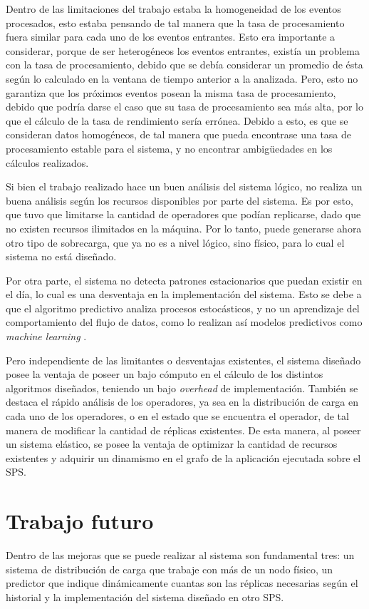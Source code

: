 Dentro de las limitaciones del trabajo estaba la homogeneidad de los eventos procesados, esto estaba pensando de tal manera que la tasa de procesamiento fuera similar para cada uno de los eventos entrantes. Esto era importante a considerar, porque de ser heterogéneos los eventos entrantes, existía un problema con la tasa de procesamiento, debido que se debía considerar un promedio de ésta según lo calculado en la ventana de tiempo anterior a la analizada. Pero, esto no garantiza que los próximos eventos posean la misma tasa de procesamiento, debido que podría darse el caso que su tasa de procesamiento sea más alta, por lo que el cálculo de la tasa de rendimiento sería errónea. Debido a esto, es que se consideran datos homogéneos, de tal manera que pueda encontrase una tasa de procesamiento estable para el sistema, y no encontrar ambigüedades en los cálculos realizados.

Si bien el trabajo realizado hace un buen análisis del sistema lógico, no realiza un buena análisis según los recursos disponibles por parte del sistema. Es por esto, que tuvo que limitarse la cantidad de operadores que podían replicarse, dado que no existen recursos ilimitados en la máquina. Por lo tanto, puede generarse ahora otro tipo de sobrecarga, que ya no es a nivel lógico, sino físico, para lo cual el sistema no está diseñado.

Por otra parte, el sistema no detecta patrones estacionarios que puedan existir en el día, lo cual es una desventaja en la implementación del sistema. Esto se debe a que el algoritmo predictivo analiza procesos estocásticos, y no un aprendizaje del comportamiento del flujo de datos, como lo realizan así modelos predictivos como \textit{machine learning} \citep{bookMohri2012}.

Pero independiente de las limitantes o desventajas existentes, el sistema diseñado posee la ventaja de poseer un bajo cómputo en el cálculo de los distintos algoritmos diseñados, teniendo un bajo \textit{overhead} de implementación. También se destaca el rápido análisis de los operadores, ya sea en la distribución de carga en cada uno de los operadores, o en el estado que se encuentra el operador, de tal manera de modificar la cantidad de réplicas existentes. De esta manera, al poseer un sistema elástico, se posee la ventaja de optimizar la cantidad de recursos existentes y adquirir un dinamismo en el grafo de la aplicación ejecutada sobre el SPS.

\section{Trabajo futuro}
Dentro de las mejoras que se puede realizar al sistema son fundamental tres: un sistema de distribución de carga que trabaje con más de un nodo físico, un predictor que indique dinámicamente cuantas son las réplicas necesarias según el historial y la implementación del sistema diseñado en otro SPS.


